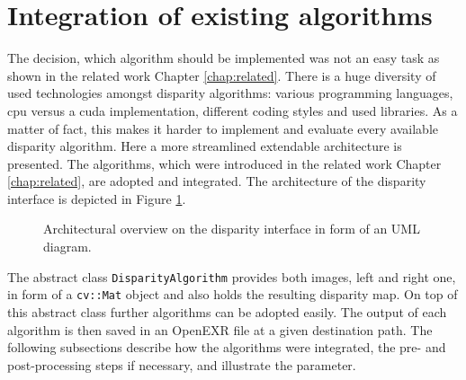 \newpage

\section{Integration of existing algorithms}

The decision, which algorithm should be implemented was not an easy task as shown in the related work Chapter \ref{chap:related}.
There is a huge diversity of used technologies amongst disparity algorithms: various programming languages, cpu versus a cuda implementation, different coding styles and used libraries.
As a matter of fact, this makes it harder to implement and evaluate every available disparity algorithm.
Here a more streamlined extendable architecture is presented.
The algorithms, which were introduced in the related work Chapter \ref{chap:related}, are adopted and integrated.
The architecture of the disparity interface is depicted in Figure \ref{fig:uml-disparity-interface}.

\begin{figure}[h!]
  \centering
  \caption{Architectural overview on the disparity interface in form of an UML diagram.}
  \label{fig:uml-disparity-interface}
\end{figure}

\noindent The abstract class \texttt{DisparityAlgorithm} provides both images, left and right one, in form of a \texttt{cv::Mat} object and also holds the resulting disparity map.
On top of this abstract class further algorithms can be adopted easily.
The output of each algorithm is then saved in an OpenEXR file at a given destination path.
The following subsections describe how the algorithms were integrated, the pre- and post-processing steps if necessary, and illustrate the parameter.

